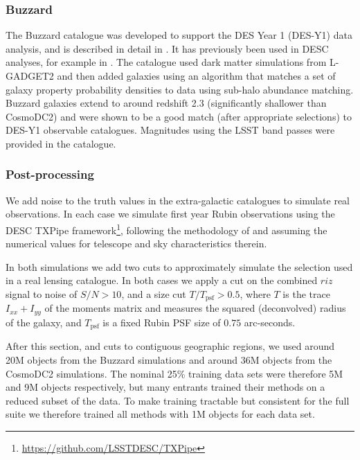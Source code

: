 \documentclass[twocolumn,twocolappendix]{aastex63}
\begin{document}
\subsubsection{Buzzard}

The Buzzard catalogue was developed to support the DES Year 1 (DES-Y1)
data analysis, and is described in detail in \citet{buzzard}.
It has previously been used in DESC analyses, for example in \citet{dc1_pz}.
The catalogue used dark
matter simulations from L-GADGET2 \cite{gadget2} and then added galaxies using
an algorithm that matches a set of galaxy
property probability densities to data using sub-halo abundance matching. 
Buzzard galaxies extend to around redshift 2.3 (significantly shallower than CosmoDC2)
and were shown to be a good
match (after appropriate selections) to DES-Y1 observable catalogues.  Magnitudes
using the LSST band passes were provided in the catalogue.

\subsubsection{Post-processing} \label{sec:data-proc}

We add noise to the truth values in the extra-galactic catalogues to simulate real observations.
In each case we simulate first year Rubin observations
using the DESC {\sc TXPipe} framework\footnote{\url{https://github.com/LSSTDESC/TXPipe}}, following the methodology of \citet{ivezic_jones_lupton}
and assuming the numerical values for telescope and sky characteristics therein.

In both simulations we add two cuts to approximately simulate the selection used in a real
lensing catalogue.  In both cases we apply a cut on the combined $riz$ signal to noise of
$S/N > 10$, and a size cut $T / T_\mathrm{psf} > 0.5$, where
$T$ is the trace $I_{xx} + I_{yy}$ of the moments matrix and measures the squared (deconvolved) 
radius of the
galaxy, and $T_\mathrm{psf}$ is a fixed Rubin PSF size of $0.75$ arc-seconds.

After this section, and cuts to contiguous geographic regions, we used around 20M objects from the Buzzard
simulations and around 36M objects from the CosmoDC2 simulations.  The nominal 25\% training data sets were therefore 5M and 9M objects respectively, but many entrants trained their methods on a reduced subset of the data. To make training tractable but consistent for the full suite we therefore trained all methods with 1M objects for each data set.
\end{document}
